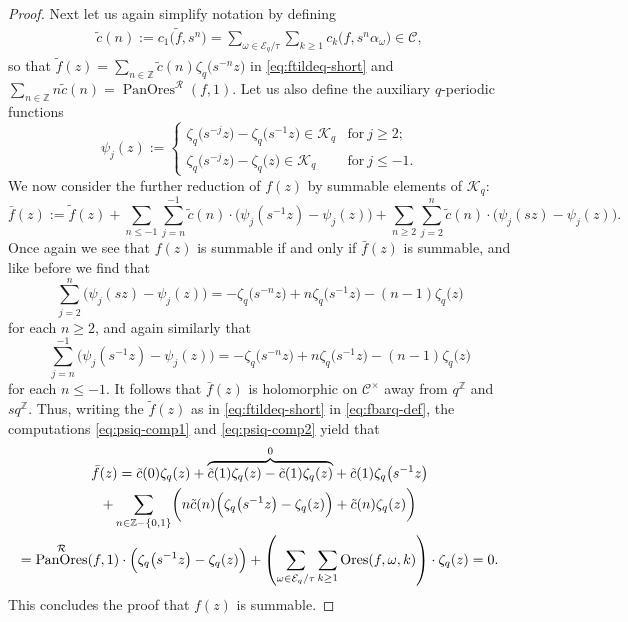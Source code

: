 \documentclass[preprint,12pt]{elsarticle}
\numberwithin{equation}{section} %
\theoremstyle{theorem}
\theoremstyle{definition}
\newcommand{\Cq}{\mathcal{C}} %
\newcommand{\bk}{\mathcal{K}} %
\newcommand{\bkq}{\bk_{q}} %
\newcommand{\ec}{\mathcal{E}} %
\newcommand{\ecq}{\ec_{q}}
\newcommand{\orbitq}{{\ecq/\tau}} %
\newcommand{\Z}{\mathbb{Z}} %
\newcommand{\zq}{\zeta_{q}}
\DeclareMathOperator{\ores}{Ores}
\DeclareMathOperator{\pano}{PanOres}
\begin{document}
\begin{proof}
    Next let us again simplify notation by defining \begin{gather*}\tilde{c}(n):=c_1\bigl(\tilde{f},s^n\bigr)=\sum_{\omega\in\orbitq}\sum_{k\geq 1}c_k\bigl(f,s^n\alpha_\omega\bigr)\in\Cq,
      \end{gather*} so that $\tilde{f}(z)=\sum_{n\in\mathbb{Z}}\tilde{c}(n)\zq\bigl(s^{-n}z\bigr)$ in \eqref{eq:ftildeq-short} and $\sum_{n\in\mathbb{Z}}n\tilde{c}(n)=\pano^\mathcal{R}(f,1)$. Let us also define the auxiliary $q$-periodic functions
    \begin{equation}\label{eq:psiq-def}
        \psi_j(z):=
        \begin{cases}\zq\bigl(s^{-j}z\bigr)-\zq\bigl(s^{-1}z\bigr)\in\bkq & \text{for} \ j\geq 2;\\
            \zq\bigl(s^{-j}z\bigr)-\zq\bigl(z\bigr)\in\bkq & \text{for} \ j\leq -1.\end{cases}
    \end{equation} We now consider the further reduction of $f(z)$ by summable elements of $\bkq$: 
      \begin{equation}
        \bar{f}(z):=\tilde{f}(z)+\sum_{n\leq -1}\sum_{j=n}^{-1}\tilde{c}(n)\cdot\bigl(\psi_j(s^{-1}z)-\psi_j(z)\bigr)+\sum_{n\geq 2}\sum_{j=2}^n\tilde{c}(n)\cdot\bigl(\psi_j(sz)-\psi_j(z)\bigr).\label{eq:fbarq-def}
    \end{equation}
    Once again we see that $f(z)$ is summable if and only if $
    \bar{f}(z)$ is summable, and like before we find that \begin{equation}\label{eq:psiq-comp1}\sum_{j=2}^n\bigl(\psi_j(sz)-\psi_j(z)\bigr)=-\zq\bigl(s^{-n}z\bigr)+n\zq\bigl(s^{-1}z\bigr)-(n-1)\zq\bigl(z\bigr)\end{equation} for each $n\geq 2$, and again similarly that \begin{equation}\label{eq:psiq-comp2}\sum_{j=n}^{-1}\bigl(\psi_j(s^{-1}z)-\psi_j(z)\bigr)=-\zq\bigl(s^{-n}z\bigr)+n\zq\bigl(s^{-1}z\bigr)-(n-1)\zq\bigl(z\bigr)\end{equation} for each $n\leq -1$. It follows that $\bar{f}(z)$ is holomorphic on $\Cq^\times$ away from $q^\Z$ and $sq^\Z$.
    Thus, writing the $\tilde{f}(z)$ as in \eqref{eq:ftildeq-short} in \eqref{eq:fbarq-def}, the computations \eqref{eq:psiq-comp1} and \eqref{eq:psiq-comp2} yield that \vspace{-.07in} \begin{multline*}
        \bar{f}(z)=\tilde{c}(0)\zq(z)+{\overbrace{\tilde{c}(1)\zq(z)-\tilde{c}(1)\zq(z)}^0}+\tilde{c}(1)\zq\bigl(s^{-1}z\bigr)\\ + \sum_{n\in\mathbb{Z}-\{0,1\}}\biggl(n\tilde{c}(n)\Bigl(\zq\bigl(s^{-1}z\bigr)-\zq(z)\Bigr)+\tilde{c}(n)\zq(z)\biggr)\\
        =\pano^\mathcal{R}(f,1)\cdot\Bigl(\zq\bigl(s^{-1}z\bigr)-\zq(z)\Bigr)+\left(\sum_{\omega\in\orbitq}\sum_{k\geq 1}\ores(f,\omega,k)\right)\cdot\zq(z)=0.
    \end{multline*}
    This concludes the proof that $f(z)$ is summable.
\end{proof}
\end{document}
